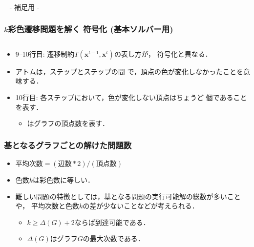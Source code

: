\appendix
\backupbegin

\begin{frame}{~}
 \centering
 - 補足用 -
\end{frame} 

\begin{frame}[shrink]
  \frametitle{$k$彩色遷移問題を解く 符号化 {\small(基本ソルバー用)}}

\begin{columns}[t]
\begin{column}{0.9\linewidth}
\begin{exampleblock}{}
 
\end{exampleblock}    
\end{column}
\end{columns}

\begin{itemize}
  \item 9--10行目: 遷移制約$T(\bm{x}^{t-1},\bm{x}^{t})$の表し方が，
    符号化と異なる．
  \item アトムは，ステップとステップの間
    で，頂点の色が変化しなかったことを意味する．
  \item 10行目: 各ステップにおいて，色が変化しない頂点はちょうど
    個であることを表す．
    \begin{itemize}
      \item {}はグラフの頂点数を表す．
    \end{itemize}
\end{itemize}

\end{frame}
\begin{frame}[shrink]
  \frametitle{基となるグラフごとの解けた問題数}
  
  \begin{exampleblock}{}
    \centering
    \scalebox{0.8}{}
  \end{exampleblock}
  \begin{itemize}
    \item $\textrm{平均次数} = (\textrm{辺数}*2) / (\textrm{頂点数})$
    \item 色数$k$は彩色数に等しい．
    \item 難しい問題の特徴としては，基となる問題の実行可能解の総数が多いことや，
      平均次数と色数$k$の差が少ないことなどが考えられる．
      \begin{itemize}
        \item $k \ge \Delta(G) + 2$ならば到達可能である．
        \item $\Delta(G)$はグラフ$G$の最大次数である．
      \end{itemize}
  \end{itemize}
\end{frame}
